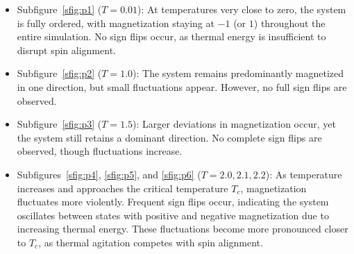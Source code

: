 \begin{itemize}
	\item Subfigure~\ref{sfig:p1} ($T=0.01$): At temperatures very close to zero, the system is fully ordered, with magnetization staying at $-1$ (or $1$) throughout the entire simulation. No sign flips occur, as thermal energy is insufficient to disrupt spin alignment.
\item Subfigure~\ref{sfig:p2} ($T=1.0$): The system remains predominantly magnetized in one direction, but small fluctuations appear. However, no full sign flips are observed.
\item Subfigure~\ref{sfig:p3} ($T=1.5$): Larger deviations in magnetization occur, yet the system still retains a dominant direction. No complete sign flips are observed, though fluctuations increase.
\item Subfigures~\ref{sfig:p4}, \ref{sfig:p5}, and \ref{sfig:p6} ($T=2.0,2.1,2.2$): As temperature increases and approaches the critical temperature $T_c$, magnetization fluctuates more violently. Frequent sign flips occur, indicating the system oscillates between states with positive and negative magnetization due to increasing thermal energy. These fluctuations become more pronounced closer to $T_c$, as thermal agitation competes with spin alignment.
\end{itemize}

